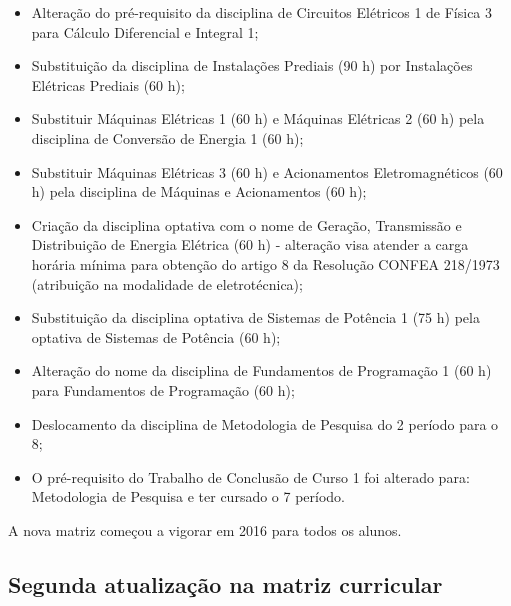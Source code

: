 \begin{itemize}
	\item Alteração do pré-requisito da disciplina de Circuitos Elétricos 1 de Física 3 para Cálculo Diferencial e Integral 1;
	
	\item Substituição da disciplina de Instalações Prediais (90 h) por Instalações Elétricas Prediais (60 h);
	
	\item Substituir Máquinas Elétricas 1 (60 h) e Máquinas Elétricas 2 (60 h) pela disciplina de Conversão de Energia 1 (60 h);
	
	\item Substituir Máquinas Elétricas 3 (60 h) e Acionamentos Eletromagnéticos (60 h) pela disciplina de Máquinas e Acionamentos (60 h);
	
	\item Criação da disciplina optativa com o nome de Geração, Transmissão e Distribuição de Energia Elétrica (60 h) - alteração visa atender a carga horária mínima para obtenção do artigo 8\textordmasculine{} da Resolução CONFEA 218/1973 (atribuição na modalidade de eletrotécnica);
	
	\item Substituição da disciplina optativa de Sistemas de Potência 1 (75 h) pela optativa de Sistemas de Potência (60 h);
	
	\item Alteração do nome da disciplina de Fundamentos de Programação 1 (60 h) para Fundamentos de Programação (60 h);
	
	\item Deslocamento da disciplina de Metodologia de Pesquisa do 2\textordmasculine{} período para o 8\textordmasculine{};
	
	\item O pré-requisito do Trabalho de Conclusão de Curso 1 foi alterado para: Metodologia de Pesquisa e ter cursado o 7\textordmasculine{} período.
	
	
\end{itemize}

A nova matriz começou a vigorar em 2016 para todos os alunos.

\subsection{Segunda atualização na matriz curricular}

